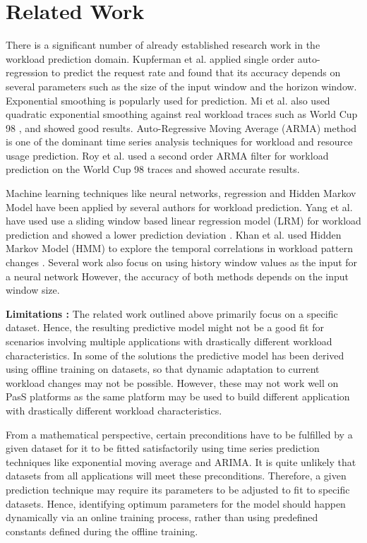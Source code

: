 \section{Related Work}

There is a significant number of already established research work in the workload prediction domain.  Kupferman et al. \cite{Kupferman_2009} applied single order auto-regression to predict the request rate and found that its accuracy depends on several parameters such as the size of the input window and the horizon window. Exponential smoothing is popularly used for prediction. Mi et al. \cite{Mi_2010} also used quadratic exponential smoothing against real workload traces such as World Cup 98 \cite{WorldCup_1998}, and showed good results. Auto-Regressive Moving Average (ARMA) method is one of the dominant time series analysis techniques for workload and resource usage prediction. Roy et al. \cite{Roy_2011} used a second order ARMA filter for workload prediction on the World Cup 98 traces and showed accurate results.  

Machine learning techniques like neural networks, regression and Hidden Markov Model have been applied by several authors for workload prediction. Yang et al.\cite{Yang_2013} have used use a sliding window based linear regression model (LRM) for workload prediction and showed a lower prediction deviation  . Khan et al. \cite{Khan_2012} used Hidden Markov Model (HMM) to explore the temporal correlations in workload pattern changes . Several work also focus on using history window values as the input for a neural network \cite{Islam_2012} However, the accuracy of both methods depends on the input window size.



\textbf{Limitations :} The related work outlined above primarily focus on a specific dataset. Hence, the resulting predictive model might not be a good fit for scenarios involving multiple applications with drastically different workload characteristics. In some of the solutions the predictive model has been derived using offline training on datasets, so that dynamic adaptation to current workload changes may not be possible. However, these may not work well on PasS platforms as the same platform may be used to build different application with drastically different workload characteristics.

From a mathematical perspective, certain preconditions have to be fulfilled by a given dataset for it to be fitted satisfactorily using time series prediction techniques like exponential moving average and ARIMA. It is quite unlikely that datasets from all applications will meet these preconditions. Therefore, a given prediction technique may require its parameters to be adjusted to fit to specific datasets. Hence, identifying optimum parameters for the model should happen dynamically via an online training process, rather than using predefined constants defined during the offline training.